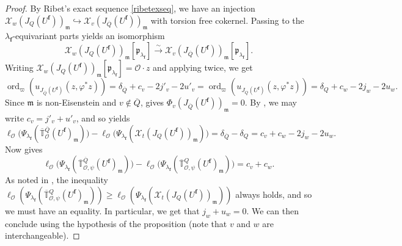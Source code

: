 \documentclass[a4paper, notitlepage, 10pt]{amsart}
\theoremstyle{plain} %
\theoremstyle{definition} %
\theoremstyle{remark} %
\numberwithin{equation}{section}
\newcommand{\bbT}{\mathbb T}
\newcommand{\ord}{\operatorname{ord}} %
\begin{document}
\begin{proof}
    By Ribet's exact sequence \eqref{ribetexseq}, we have an injection $\mathcal{X}_{w}(J_{Q}(U^{\mathbf{f}}))_{\mathfrak{m}} \hookrightarrow \mathcal{X}_{v}(J_{\overline{Q}}(U^{\mathbf{f}}))_{\mathfrak{m}}$ with torsion free cokernel. Passing to the $\lambda_{\mathbf{f}}$-equivariant parts yields an isomorphism $$\mathcal{X}_{w}(J_{Q}(U^{\mathbf{f}}))_{\mathfrak{m}}[\mathfrak{p}_{\lambda_{\mathbf{f}}}] \xrightarrow{\sim} \mathcal{X}_{v}(J_{\overline{Q}}(U^{\mathbf{f}}))_{\mathfrak{m}}[\mathfrak{p}_{\lambda_{\mathbf{f}}}].$$
    Writing $\mathcal{X}_{w}(J_{Q}(U^{\mathbf{f}}))_{\mathfrak{m}}[\mathfrak{p}_{\lambda_{\mathbf{f}}}]=\mathcal{O}\cdot z$ and applying  twice, we get
    $$ \ord_{\varpi}(u_{J_{\overline{Q}}(U^{\mathbf{f}})}(z,\varphi^*z))=\delta_{\overline{Q}}+c_{v}-2j'_{v}-2u'_{v}
    = \ord_{\varpi}(u_{J_{Q}(U^{\mathbf{f}})}(z,\varphi^*z))=\delta_Q+c_{w}-2j_{w}-2u_{w}.$$
    Since $\mathfrak{m}$ is non-Eisenstein and $v\not\in \overline{Q}$, \cite[Proposition 5]{Raj01} gives $\Phi_{v}(J_{\overline{Q}}(U^{\mathbf{f}}))_{\mathfrak{m}}=0$. By , we may write $c_{v}=j'_{v}+u'_{v}$, and so  yields
    $$ \ell_{\mathcal{O}}\big(\Psi_{\lambda_{\mathbf{f}}}(\overline{\bbT}{}^{\overline{Q}}_{\mathcal{O}}(U^{\mathbf{f}})_{\mathfrak{m}})\big) -\ell_{\mathcal{O}}\big(\Psi_{\lambda_{\mathbf{f}}}(\mathcal{X}_t(J_{Q}(U^{\mathbf{f}}))_{\mathfrak{m}})\big) =\delta_{\overline{Q}}-\delta_Q=c_{v}+c_{w}-2j_{w}-2u_{w}. $$
    Now  gives
    $$ \ell_{\mathcal{O}}\big(\Psi_{\lambda_{\mathbf{f}}}(\overline{\bbT}{}^{\overline{Q}}_{\mathcal{O},\psi}(U^{\mathbf{f}})_{\mathfrak{m}})\big)- \ell_{\mathcal{O}}\big(\Psi_{\lambda_{\mathbf{f}}}(\overline{\bbT}{}^{Q}_{\mathcal{O},\psi}(U^{\mathbf{f}})_{\mathfrak{m}})\big)= c_{v}+c_{w}. $$
    As noted in , the inequality $\ell_{\mathcal{O}}(\Psi_{\lambda_{\mathbf{f}}}(\overline{\bbT}{}^{Q}_{\mathcal{O},\psi}(U^{\mathbf{f}})_{\mathfrak{m}}))\ge \ell_{\mathcal{O}}(\Psi_{\lambda_{\mathbf{f}}}(\mathcal{X}_t(J_{Q}(U^{\mathbf{f}}))_{\mathfrak{m}})) $ always holds, and so we must have an equality. In particular, we get that $j_{w}+u_{w}=0$. We can then conclude using the hypothesis of the proposition (note that $v$ and $w$ are interchangeable).
\end{proof}
\end{document}
